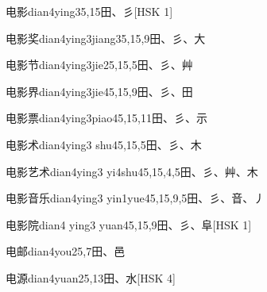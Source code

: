 \begin{entry}{电影}{dian4ying3}{5,15}{⽥、⼺}[HSK 1]
\end{entry}

\begin{entry}{电影奖}{dian4ying3jiang3}{5,15,9}{⽥、⼺、⼤}
\end{entry}

\begin{entry}{电影节}{dian4ying3jie2}{5,15,5}{⽥、⼺、⾋}
\end{entry}

\begin{entry}{电影界}{dian4ying3jie4}{5,15,9}{⽥、⼺、⽥}
\end{entry}

\begin{entry}{电影票}{dian4ying3piao4}{5,15,11}{⽥、⼺、⽰}
\end{entry}

\begin{entry}{电影术}{dian4ying3 shu4}{5,15,5}{⽥、⼺、⽊}
\end{entry}

\begin{entry}{电影艺术}{dian4ying3 yi4shu4}{5,15,4,5}{⽥、⼺、⾋、⽊}
\end{entry}

\begin{entry}{电影音乐}{dian4ying3 yin1yue4}{5,15,9,5}{⽥、⼺、⾳、⼃}
\end{entry}

\begin{entry}{电影院}{dian4 ying3 yuan4}{5,15,9}{⽥、⼺、⾩}[HSK 1]
\end{entry}

\begin{entry}{电邮}{dian4you2}{5,7}{⽥、⾢}
\end{entry}

\begin{entry}{电源}{dian4yuan2}{5,13}{⽥、⽔}[HSK 4]
\end{entry}

